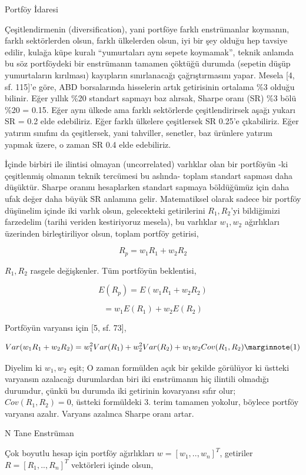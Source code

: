 \documentclass[12pt,fleqn]{article}\usepackage{../../common}
\begin{document}
Portföy İdaresi

Çeşitlendirmenin (diversification), yani portföye farklı enstrümanlar koymanın,
farklı sektörlerden olsun, farklı ülkelerden olsun, iyi bir şey olduğu hep
tavsiye edilir, kulağa küpe kuralı ``yumurtaları aynı sepete koymamak'', teknik
anlamda bu söz portföydeki bir enstrümanın tamamen çöktüğü durumda (sepetin
düşüp yumurtaların kırılması) kayıpların sınırlanacağı çağrıştırmasını
yapar. Mesela [4, sf. 115]'e göre, ABD borsalarında hisselerin artık getirisinin
ortalama \%3 olduğu bilinir. Eğer yıllık \%20 standart sapmayı baz alırsak,
Sharpe oranı (SR) \%3 bölü \%20 = 0.15. Eğer aynı ülkede ama farklı sektörlerde
çeşitlendirirsek aşağı yukarı SR = 0.2 elde edebiliriz. Eğer farklı ülkelere
çeşitlersek SR 0.25'e çıkabiliriz. Eğer yatırım sınıfını da çeşitlersek, yani
tahviller, senetler, baz ürünlere yatırım yapmak üzere, o zaman SR 0.4 elde
edebiliriz.

İçinde birbiri ile ilintisi olmayan (uncorrelated) varlıklar olan bir
portföyün -ki çeşitlenmiş olmanın teknik tercümesi bu aslında- toplam
standart sapması daha düşüktür. Sharpe oranını hesaplarken standart sapmaya
böldüğümüz için daha ufak değer daha büyük SR anlamına gelir. Matematiksel
olarak sadece bir portföy düşünelim içinde iki varlık olsun, gelecekteki
getirilerini $R_1,R_2$'yi bildiğimizi farzedelim (tarihi veriden
kestiriyoruz mesela), bu varlıklar $w_1,w_2$ ağırlıkları üzerinden
birleştiriliyor olsun, toplam portföy getirisi,

$$ R_p = w_1 R_1 + w_2 R_2 $$

$R_1,R_2$ rasgele değişkenler. Tüm portföyün beklentisi, 

$$ E(R_p) = E(w_1 R_1 + w_2 R_2) $$

$$ = w_1 E(R_1) + w_2 E(R_2) $$

Portföyün varyansı için [5, sf. 73], 

$$Var(w_1 R_1 + w_2 R_2) = w_1^2Var(R_1) + w_2^2 Var(R_2) + w_1w_2Cov(R_1,R_2)
 \mlabel{1}$$

Diyelim ki $w_1,w_2$ eşit; O zaman formülden açık bir şekilde görülüyor ki
üstteki varyansın azalacağı durumlardan biri iki enstrümanın hiç ilintili
olmadığı durumdur, çünkü bu durumda iki getirinin kovaryansı sıfır olur;
$Cov(R_1,R_2)=0$, üstteki formüldeki 3. terim tamamen yokolur, böylece
portföy varyansı azalır. Varyans azalınca Sharpe oranı artar. 

N Tane Enstrüman

Çok boyutlu hesap için portföy ağırlıkları $w = [w_1,..,w_n]^T$, getiriler 
$R = [R_1,..,R_n]^T$ vektörleri içinde olsun, 
\end{document}
